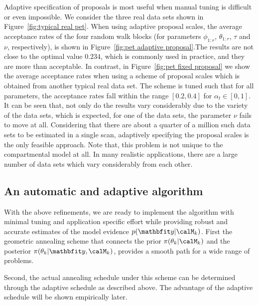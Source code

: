 Adaptive specification of proposals is most useful when manual tuning is
difficult or even impossible. We consider the three real \pet data sets shown
in Figure~\ref{fig:typical real pet}. When using adaptive proposal scales, the
average acceptance rates of the four random walk blocks (for parameters
$\phi_{1:r}$, $\theta_{1:r}$, $\tau$ and $\nu$, respectively), is shown in
Figure~\ref{fig:pet adaptive proposal}.The results are not close to the
optimal value $0.234$, which is commonly used in practice, and they are more
than acceptable. In contrast, in Figure~\ref{fig:pet fixed proposal} we show
the average acceptance rates when using a scheme of proposal scales which is
obtained from another typical real \pet data set. The scheme is tuned such
that for all parameters, the acceptance rates fall within the range $[0.2,
0.4]$ for $\alpha_t \in [0, 1]$. It can be seen that, not only do the results
vary considerably due to the variety of the data sets, which is expected, for
one of the data sets, the parameter $\nu$ fails to move at all. Considering
that there are about a quarter of a million such data sets to be estimated in
a single \pet scan, adaptively specifying the proposal scales is the only
feasible approach. Note that, this problem is not unique to the \pet
compartmental model at all. In many realistic applications, there are a large
number of data sets which vary considerably from each other.

\subsection{An automatic and adaptive algorithm}
\label{sub:An automatic and adaptive algorithm}

With the above refinements, we are ready to implement the \smc[2] algorithm
with minimal tuning and application specific effort while providing robust and
accurate estimates of the model evidence $p(\data|\calM_k)$. First the
geometric annealing scheme that connects the prior $\pi(\theta_k|\calM_k)$ and
the posterior $\pi(\theta_k|\data,\calM_k)$, provides a smooth path for a wide
range of problems.

Second, the actual annealing schedule under this scheme can be determined
through the adaptive schedule as described above. The advantage of the
adaptive schedule will be shown empirically later.

